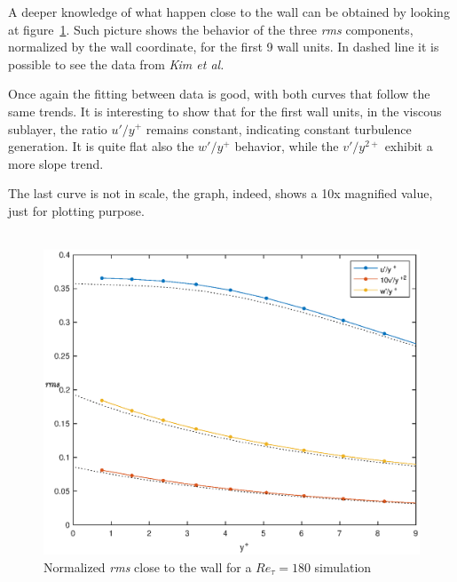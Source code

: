 A deeper knowledge of what happen close to the wall can be obtained by looking at figure~\ref{wall:rms:180}.
Such picture shows the behavior of the three \emph{rms} components, normalized by the wall coordinate, for the first 9 wall units. In dashed line it is possible to see the data from \emph{Kim et al.} \par
Once again the fitting between data is good, with both curves that follow the same trends.
It is interesting to show that for the first wall units, in the viscous sublayer, the ratio $u'/y^{+}$ remains constant, indicating constant turbulence generation. It is quite flat also the $w'/y^{+}$ behavior, while the $v'/y^{2+}$ exhibit a more slope trend.\par
The last curve is not in scale, the graph, indeed, shows a 10x magnified value, just for plotting purpose.\\~\par

\begin{figure}
\begin{center}
\includegraphics[scale=0.55]{grafici/wall_rms_180.eps}
\caption{Normalized \emph{rms} close to the wall for a $Re_{\tau}=180$ simulation}
\label{wall:rms:180}
\end{center} 
\end{figure}


